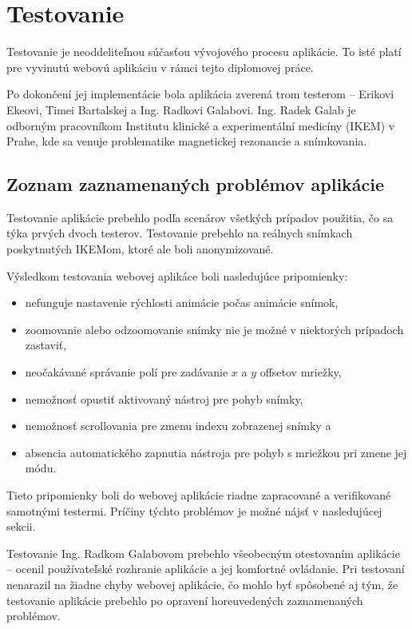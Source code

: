 \chapter {Testovanie}
Testovanie je neoddeliteľnou súčasťou vývojového procesu aplikácie. To isté platí pre vyvinutú webovú aplikáciu v rámci tejto diplomovej práce.

Po dokončení jej implementácie bola aplikácia zverená trom testerom -- Erikovi Ekeovi, Timei Bartalskej a Ing. Radkovi Galabovi. Ing. Radek Galab je odborným pracovníkom Institutu klinické a experimentální medicíny (IKEM) v Prahe, kde sa venuje problematike magnetickej rezonancie a snímkovania.

\section {Zoznam zaznamenaných problémov aplikácie}
Testovanie aplikácie prebehlo podľa scenárov všetkých prípadov použitia, čo sa týka prvých dvoch testerov. Testovanie prebehlo na reálnych snímkach poskytnutých IKEMom, ktoré ale boli anonymizované.

Výsledkom testovania webovej aplikáce boli nasledujúce pripomienky:
\begin {itemize}
\item {nefunguje nastavenie rýchlosti animácie počas animácie snímok,}
\item {zoomovanie alebo odzoomovanie snímky nie je možné v niektorých prípadoch zastaviť,}
\item {neočakávané správanie polí pre zadávanie $x$ a $y$ offsetov mriežky,}
\item {nemožnosť opustiť aktivovaný nástroj pre pohyb snímky,}
\item {nemožnosť scrollovania pre zmenu indexu zobrazenej snímky a}
\item {absencia automatického zapnutia nástroja pre pohyb s mriežkou pri zmene jej módu.}
\end {itemize}

Tieto pripomienky boli do webovej aplikácie riadne zapracované a verifikované samotnými testermi.
Príčiny týchto problémov je možné nájsť v nasledujúcej sekcii.

Testovanie Ing. Radkom Galabovom prebehlo všeobecným otestovaním aplikácie -- ocenil používateľské rozhranie aplikácie a jej komfortné ovládanie. Pri testovaní nenarazil na žiadne chyby webovej aplikácie, čo mohlo byť spôsobené aj tým, že testovanie aplikácie prebehlo po opravení horeuvedených zaznamenaných problémov.

